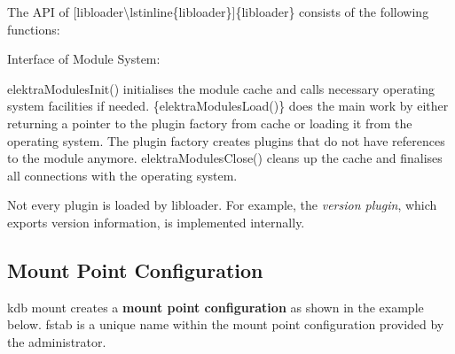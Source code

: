 The A\+P\+I of \mbox{[}libloader\textbackslash{}lstinline\{libloader\}\mbox{]}\{libloader\} consists of the following functions\+:

Interface of Module System\+: 


{\ttfamily elektra\+Modules\+Init()} initialises the module cache and calls necessary operating system facilities if needed. \{elektra\+Modules\+Load()\} does the main work by either returning a pointer to the plugin factory from cache or loading it from the operating system. The plugin factory creates plugins that do not have references to the module anymore. {\ttfamily elektra\+Modules\+Close()} cleans up the cache and finalises all connections with the operating system.

Not every plugin is loaded by {\ttfamily libloader}. For example, the {\itshape version plugin}, which exports version information, is implemented internally.

\subsection*{Mount Point Configuration}

{\ttfamily kdb mount} creates a {\bfseries mount point configuration} as shown in the example below. {\ttfamily fstab} is a unique name within the mount point configuration provided by the administrator.

